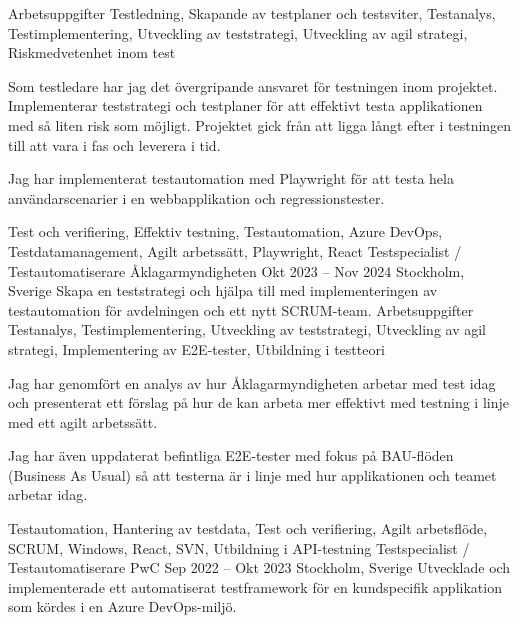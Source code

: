 \documentclass{sobCV}[2015/09/08]
\begin{document}
   {Arbetsuppgifter}{
       Testledning,
       Skapande av testplaner och testsviter,
       Testanalys,
       Testimplementering,
       Utveckling av teststrategi,
       Utveckling av agil strategi,
       Riskmedvetenhet inom test
 }{
      {
         Som testledare har jag det övergripande ansvaret för testningen inom projektet. Implementerar teststrategi och testplaner för att effektivt testa applikationen med så liten risk som möjligt. Projektet gick från att ligga långt efter i testningen till att vara i fas och leverera i tid.

         Jag har implementerat testautomation med Playwright för att testa hela användarscenarier i en webbapplikation och regressionstester.
     }
 }{
     Test och verifiering,
     Effektiv testning,
     Testautomation,
     Azure DevOps,
     Testdatamanagement,
     Agilt arbetssätt,
     Playwright,
     React
}
   \experiencenode
   {Testspecialist / Testautomatiserare}
   {Åklagarmyndigheten}
    {Okt 2023 -- Nov 2024}
   {Stockholm, Sverige}{
       Skapa en teststrategi och hjälpa till med implementeringen av testautomation för avdelningen och ett nytt SCRUM-team.
   }
   {Arbetsuppgifter}{
       Testanalys,
       Testimplementering,
       Utveckling av teststrategi,
       Utveckling av agil strategi,
       Implementering av E2E-tester,
       Utbildning i testteori
 }{
      {
       Jag har genomfört en analys av hur Åklagarmyndigheten arbetar med test idag och presenterat ett förslag på hur de kan arbeta mer effektivt med testning i linje med ett agilt arbetssätt.

       Jag har även uppdaterat befintliga E2E-tester med fokus på BAU-flöden (Business As Usual) så att testerna är i linje med hur applikationen och teamet arbetar idag.
     }
 }{
     Testautomation,
     Hantering av testdata,
     Test och verifiering,
     Agilt arbetsflöde,
     SCRUM,
     Windows,
     React,
     SVN,
     Utbildning i API-testning
}
\experiencenode
   {Testspecialist / Testautomatiserare}
   {PwC}
    {Sep 2022 -- Okt 2023}
   {Stockholm, Sverige}{
       Utvecklade och implementerade ett automatiserat testframework för en kundspecifik applikation som kördes i en Azure DevOps-miljö.
   }
\end{document}
